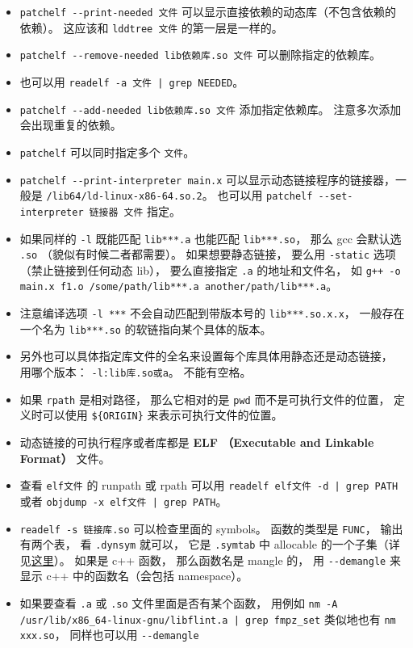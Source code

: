 \begin{itemize}
\item \verb|patchelf --print-needed 文件| 可以显示直接依赖的动态库（不包含依赖的依赖）。 这应该和 \verb|lddtree 文件| 的第一层是一样的。
\item \verb|patchelf --remove-needed lib依赖库.so 文件| 可以删除指定的依赖库。
\item 也可以用 \verb`readelf -a 文件 | grep NEEDED`。
\item \verb|patchelf --add-needed lib依赖库.so 文件| 添加指定依赖库。 注意多次添加会出现重复的依赖。
\item \verb|patchelf| 可以同时指定多个 \verb|文件|。
\item \verb|patchelf --print-interpreter main.x| 可以显示动态链接程序的链接器，一般是 \verb|/lib64/ld-linux-x86-64.so.2|。 也可以用 \verb|patchelf --set-interpreter 链接器 文件| 指定。 
\item 如果同样的 \verb`-l` 既能匹配 \verb`lib***.a` 也能匹配 \verb`lib***.so`， 那么 gcc 会默认选 \verb`.so` （貌似有时候二者都需要）。 如果想要静态链接， 要么用 \verb`-static` 选项（禁止链接到任何动态 lib）， 要么直接指定 \verb`.a` 的地址和文件名， 如 \verb`g++ -o main.x f1.o /some/path/lib***.a another/path/lib***.a`。
\item 注意编译选项 \verb|-l ***| 不会自动匹配到带版本号的 \verb|lib***.so.x.x|， 一般存在一个名为 \verb|lib***.so| 的软链指向某个具体的版本。
\item 另外也可以具体指定库文件的全名来设置每个库具体用静态还是动态链接， 用哪个版本： \verb|-l:lib库.so或a|。 不能有空格。
\item 如果 \verb|rpath| 是相对路径， 那么它相对的是 \verb|pwd| 而不是可执行文件的位置， 定义时可以使用 \verb|${ORIGIN}| 来表示可执行文件的位置。
\item 动态链接的可执行程序或者库都是 \textbf{ELF （Executable and Linkable Format）} 文件。
\item 查看 \verb|elf文件| 的 runpath 或 rpath 可以用 \verb`readelf elf文件 -d | grep PATH` 或者 \verb`objdump -x elf文件 | grep PATH`。
\item \verb|readelf -s 链接库.so| 可以检查里面的 symbols。 函数的类型是 \verb|FUNC|， 输出有两个表， 看 \verb|.dynsym| 就可以， 它是 \verb|.symtab| 中 allocable 的一个子集（详见\href{https://blogs.oracle.com/solaris/post/inside-elf-symbol-tables}{这里}）。 如果是 c++ 函数， 那么函数名是 mangle 的， 用 \verb|--demangle| 来显示 c++ 中的函数名（会包括 namespace）。
\item 如果要查看 \verb|.a| 或 \verb|.so| 文件里面是否有某个函数， 用例如 \verb`nm -A /usr/lib/x86_64-linux-gnu/libflint.a | grep fmpz_set` 类似地也有 \verb|nm xxx.so|， 同样也可以用 \verb|--demangle|

\end{itemize}
